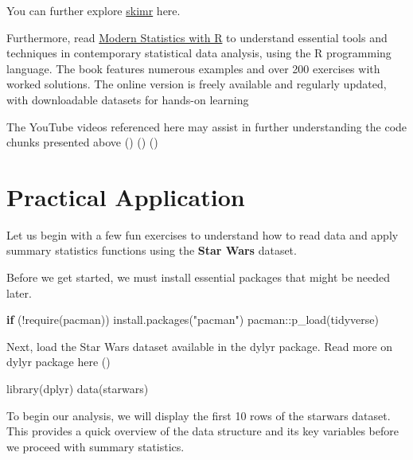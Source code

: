 \documentclass[
  man,
  floatsintext,
  longtable,
  nolmodern,
  notxfonts,
  notimes,
  colorlinks=true,linkcolor=blue,citecolor=blue,urlcolor=blue]{apa7}
\newenvironment{Shaded}{\begin{snugshade}}{\end{snugshade}}
\newcommand{\ControlFlowTok}[1]{\textcolor[rgb]{0.00,0.23,0.31}{\textbf{#1}}}
\newcommand{\FunctionTok}[1]{\textcolor[rgb]{0.28,0.35,0.67}{#1}}
\newcommand{\NormalTok}[1]{\textcolor[rgb]{0.00,0.23,0.31}{#1}}
\newcommand{\SpecialCharTok}[1]{\textcolor[rgb]{0.37,0.37,0.37}{#1}}
\newcommand{\StringTok}[1]{\textcolor[rgb]{0.13,0.47,0.30}{#1}}
\begin{document}
You can further explore \href{https://docs.ropensci.org/skimr/}{skimr}
here.

Furthermore, read
\href{https://modernstatisticswithr.com/index.html}{Modern Statistics
with R} to understand essential tools and techniques in contemporary
statistical data analysis, using the R programming language. The book
features numerous examples and over 200 exercises with worked solutions.
The online version is freely available and regularly updated, with
downloadable datasets for hands-on learning

The YouTube videos referenced here may assist in further understanding
the code chunks presented above
()
()
()

\newpage

\section{Practical Application}\label{practical-application}

Let us begin with a few fun exercises to understand how to read data and
apply summary statistics functions using the \textbf{Star Wars} dataset.

Before we get started, we must install essential packages that might be
needed later.

\begin{Shaded}
\begin{Highlighting}[]
\ControlFlowTok{if}\NormalTok{ (}\SpecialCharTok{!}\FunctionTok{require}\NormalTok{(pacman)) }\FunctionTok{install.packages}\NormalTok{(}\StringTok{"pacman"}\NormalTok{)}
\NormalTok{pacman}\SpecialCharTok{::}\FunctionTok{p\_load}\NormalTok{(tidyverse)}
\end{Highlighting}
\end{Shaded}

Next, load the Star Wars dataset available in the dylyr package. Read
more on dylyr package here ()

\begin{Shaded}
\begin{Highlighting}[]
\FunctionTok{library}\NormalTok{(dplyr)}
\FunctionTok{data}\NormalTok{(starwars)}
\end{Highlighting}
\end{Shaded}

To begin our analysis, we will display the first 10 rows of the starwars
dataset. This provides a quick overview of the data structure and its
key variables before we proceed with summary statistics.
\end{document}
